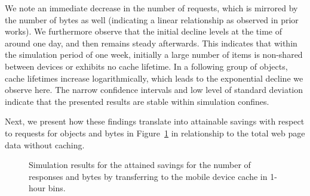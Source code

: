 \documentclass[letterpaper,conference]{IEEEtran}
\begin{document}
We note an immediate decrease in the number of requests, which is mirrored by the number of bytes as well (indicating a linear relationship as observed in prior works).
We furthermore observe that the initial decline levels at the time of around one day, and then remains steady afterwards.
This indicates that within the simulation period of one week, initially a large number of items is non-shared between devices or exhibits no cache lifetime. 
In a following group of objects, cache lifetimes increase logarithmically, which leads to the exponential decline we observe here.
The narrow confidence intervals and low level of standard deviation indicate that the presented results are stable within simulation confines.
%

Next, we present how these findings translate into attainable savings with respect to requests for objects and bytes in Figure~\ref{fig:sim2} in relationship to the total web page data without caching.
\begin{figure}[]
	\centering
	\qquad
	\caption{Simulation results for the attained savings for the number of responses and bytes by transferring to the mobile device cache in 1-hour bins.}
	\label{fig:sim2}
\end{figure}
\end{document}
